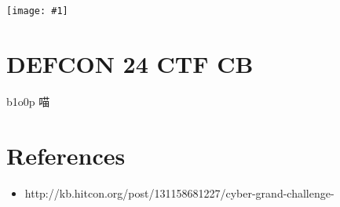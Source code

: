 \documentclass{beamer}
\newcommand{\image}[1]{
  \begin{frame}
    \texttt{[image: \#1]}
  \end{frame}
}
\begin{document}
\image{img/b1o0p.jpg}

\section{DEFCON 24 CTF CB}

\begin{frame}
  \begin{block}{b1o0p}
    喵
  \end{block}
\end{frame}

\section{References}

\begin{frame}[t,allowframebreaks]
  \begin{itemize}
    \item http://kb.hitcon.org/post/131158681227/cyber-grand-challenge-%
  \end{itemize}
  \printbibliography
 \end{frame}
\end{document}
